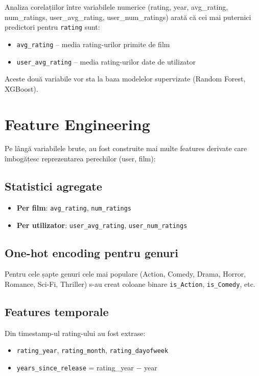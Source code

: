 \documentclass[12pt,a4paper]{article}
\begin{document}
Analiza corelațiilor între variabilele numerice (rating, year, avg\_rating, num\_ratings, user\_avg\_rating, user\_num\_ratings) arată că cei mai puternici predictori pentru \texttt{rating} sunt:
\begin{itemize}[noitemsep]
    \item \texttt{avg\_rating} -- media rating-urilor primite de film
    \item \texttt{user\_avg\_rating} -- media rating-urilor date de utilizator
\end{itemize}

Aceste două variabile vor sta la baza modelelor supervizate (Random Forest, XGBoost).

\section{Feature Engineering}

Pe lângă variabilele brute, au fost construite mai multe features derivate care îmbogățesc reprezentarea perechilor (user, film):

\subsection{Statistici agregate}

\begin{itemize}[noitemsep]
    \item \textbf{Per film}: \texttt{avg\_rating}, \texttt{num\_ratings}
    \item \textbf{Per utilizator}: \texttt{user\_avg\_rating}, \texttt{user\_num\_ratings}
\end{itemize}

\subsection{One-hot encoding pentru genuri}

Pentru cele șapte genuri cele mai populare (Action, Comedy, Drama, Horror, Romance, Sci-Fi, Thriller) s-au creat coloane binare \texttt{is\_Action}, \texttt{is\_Comedy}, etc.

\subsection{Features temporale}

Din timestamp-ul rating-ului au fost extrase:
\begin{itemize}[noitemsep]
    \item \texttt{rating\_year}, \texttt{rating\_month}, \texttt{rating\_dayofweek}
    \item \texttt{years\_since\_release} = rating\_year $-$ year
\end{itemize}
\end{document}
